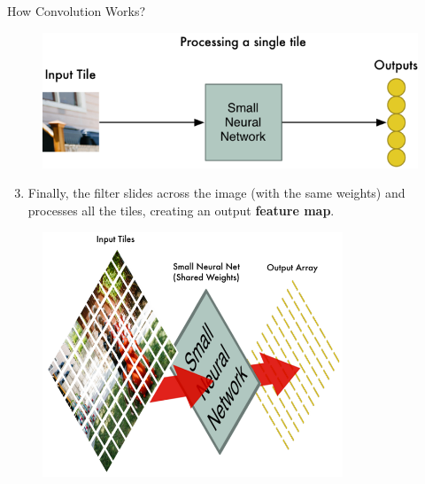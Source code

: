 \documentclass[10pt]{beamer}
\theoremstyle{remark}
\theoremstyle{definition}
\begin{document}
\begin{frame}[allowframebreaks]{How Convolution Works?}
\begin{figure}
\centering
\includegraphics[width=1.0\textwidth,height=0.9\textheight,keepaspectratio]{./images/conv_4.png}
\end{figure}

\framebreak

\begin{enumerate}
    \setcounter{enumi}{2}
    \item Finally, the filter slides across the image (with the same weights) and processes all the tiles, creating an output \textbf{feature map}.
\end{enumerate}

\begin{figure}
\centering
\includegraphics[width=0.8\textwidth,height=0.8\textheight,keepaspectratio]{./images/conv_5.png}
\end{figure}


\framebreak


\end{frame}
\end{document}
